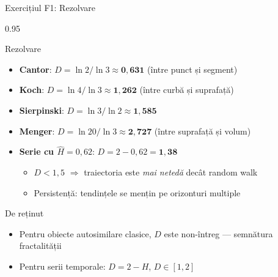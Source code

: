 \documentclass[9pt, aspectratio=169, t]{beamer}
\begin{document}
\begin{frame}[shrink=25]{Exercițiul F1: Rezolvare}
\begin{cminipage}{0.95\textwidth}
\begin{exampleblock}{Rezolvare}
\begin{itemize}\setlength{\itemsep}{0pt}
    \item \textbf{Cantor}: $D = \ln 2 / \ln 3 \approx \mathbf{0{,}631}$ \quad (între punct și segment)
    \item \textbf{Koch}: $D = \ln 4 / \ln 3 \approx \mathbf{1{,}262}$ \quad (între curbă și suprafață)
    \item \textbf{Sierpinski}: $D = \ln 3 / \ln 2 \approx \mathbf{1{,}585}$
    \item \textbf{Menger}: $D = \ln 20 / \ln 3 \approx \mathbf{2{,}727}$ \quad (între suprafață și volum)
    \item \textbf{Serie cu $\hat H = 0{,}62$}: $D = 2 - 0{,}62 = \mathbf{1{,}38}$
    \begin{itemize}\setlength{\itemsep}{0pt}
        \item $D < 1{,}5$ $\Rightarrow$ traiectoria este \emph{mai netedă} decât random walk
        \item Persistență: tendințele se mențin pe orizonturi multiple
    \end{itemize}
\end{itemize}
\end{exampleblock}
\begin{block}{De reținut}
\begin{itemize}\setlength{\itemsep}{0pt}
    \item Pentru obiecte autosimilare clasice, $D$ este non-întreg --- semnătura fractalității
    \item Pentru serii temporale: $D = 2 - H$, $D \in [1, 2]$
\end{itemize}
\end{block}
\end{cminipage}
\end{frame}
\end{document}
